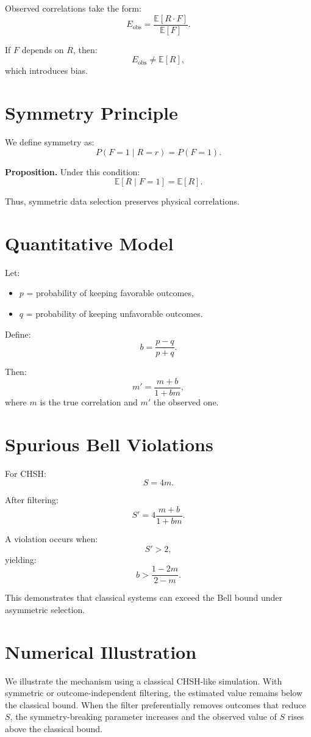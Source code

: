 \documentclass[aps,prl,onecolumn,superscriptaddress]{revtex4-2}
\begin{document}
Observed correlations take the form:
\[
E_{\text{obs}} = \frac{\mathbb{E}[R \cdot F]}{\mathbb{E}[F]}.
\]

If $F$ depends on $R$, then:
\[
E_{\text{obs}} \neq \mathbb{E}[R],
\]
which introduces bias.

\section{Symmetry Principle}

We define symmetry as:
\[
P(F=1 \mid R=r) = P(F=1).
\]

\textbf{Proposition.}
Under this condition:
\[
\mathbb{E}[R \mid F=1] = \mathbb{E}[R].
\]

Thus, symmetric data selection preserves physical correlations.

\section{Quantitative Model}

Let:
\begin{itemize}
\item $p$ = probability of keeping favorable outcomes,
\item $q$ = probability of keeping unfavorable outcomes.
\end{itemize}

Define:
\[
b = \frac{p - q}{p + q}.
\]

Then:
\[
m' = \frac{m + b}{1 + b m},
\]
where $m$ is the true correlation and $m'$ the observed one.

\section{Spurious Bell Violations}

For CHSH:
\[
S = 4m.
\]

After filtering:
\[
S' = 4 \frac{m + b}{1 + b m}.
\]

A violation occurs when:
\[
S' > 2,
\]
yielding:
\[
b > \frac{1 - 2m}{2 - m}.
\]

This demonstrates that classical systems can exceed the Bell bound under asymmetric selection.

\section{Numerical Illustration}

We illustrate the mechanism using a classical CHSH-like simulation. With symmetric or outcome-independent filtering, the estimated value remains below the classical bound. When the filter preferentially removes outcomes that reduce $S$, the symmetry-breaking parameter increases and the observed value of $S$ rises above the classical bound.
\end{document}
